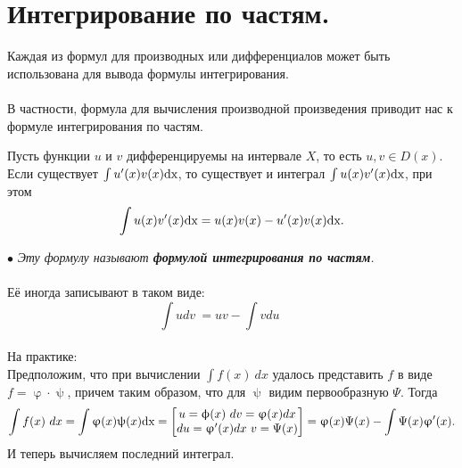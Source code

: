 \section{Интегрирование по частям.}
Каждая из формул для производных или дифференциалов может быть использована для вывода формулы интегрирования.\\\\
В частности, формула для вычисления производной произведения приводит нас к формуле интегрирования по частям.
\begin{theorem}
	Пусть функции $u$ и $v$ дифференцируемы на интервале $X$, то есть $u, v \in D(x)$. Если существует $\int u'(x)v(x)\text{dx}$, то существует и интеграл $\int u(x)v'(x)\text{dx}$, при этом $$\int u(x)v'(x)\text{dx} = u(x)v(x) -  u'(x)v(x)\text{dx}.$$
\end{theorem}
$\bullet$ \textit{Эту формулу называют\textbf{ формулой интегрирования по частям}.}\\\\
Её иногда записывают в таком виде:\\
\[
\boxed{\int\limits udv\ = uv - \int\limits vdu } \qquad
\]\\
На практике:\\
Предположим, что при вычислении $\int\limits f(x)\ dx $ удалось представить $f$ в виде $f = \upvarphi \cdot \uppsi$, причем таким образом, что для $\uppsi$ видим первообразную $\Psi$. Тогда\\
$$\int\limits f(x)\ dx = \int\limits \upvarphi(x)\uppsi(x)\text{dx} = \begin{bmatrix}  u = \upphi(x) \ dv = \upvarphi(x) dx  \\ du = \upvarphi '(x)dx \ v = \Psi (x)  \end{bmatrix} = \upvarphi (x) \Psi (x) - \int\limits \Psi(x) \upvarphi '(x).$$ И теперь вычисляем последний интеграл.
